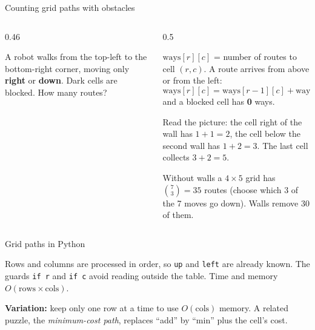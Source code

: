 \documentclass[aspectratio=169,10pt]{beamer}
\newcommand{\figtab}[2][0.5]{\begin{sfig}[#1]\end{sfig}}
\begin{document}
\begin{frame}{Counting grid paths with obstacles}
\begin{columns}[T]
\begin{column}{0.46\textwidth}
\figtab[0.6]{fig_grid}
\vspace{1mm}
{\small
A robot walks from the top-left to the bottom-right corner, moving only \textbf{right} or \textbf{down}. Dark cells are blocked. How many routes?}
\end{column}
\begin{column}{0.5\textwidth}
{\small
$\mathrm{ways}[r][c]$ = number of routes to cell $(r,c)$. A route arrives from above or from the left:
\[\mathrm{ways}[r][c]=\mathrm{ways}[r-1][c]+\mathrm{ways}[r][c-1],\]
and a blocked cell has \textbf{0} ways.

\vspace{2mm}
Read the picture: the cell right of the wall has $1+1=2$, the cell below the second wall has $1+2=3$. The last cell collects $3+2=5$.

\vspace{2mm}
Without walls a $4\times5$ grid has $\binom{7}{3}=35$ routes (choose which 3 of the 7 moves go down). Walls remove 30 of them.}
\end{column}
\end{columns}
\end{frame}

\begin{frame}[allowframebreaks]{Grid paths in Python}
\framebreak
{}
\vspace{2mm}
{\small
Rows and columns are processed in order, so \texttt{up} and \texttt{left} are already known. The guards \texttt{if r} and \texttt{if c} avoid reading outside the table. Time and memory $O(\text{rows}\times\text{cols})$.

\vspace{2mm}
\textbf{Variation:} keep only one row at a time to use $O(\text{cols})$ memory. A related puzzle, the \emph{minimum-cost path}, replaces ``add'' by ``min'' plus the cell's cost.}
\end{frame}
\end{document}
